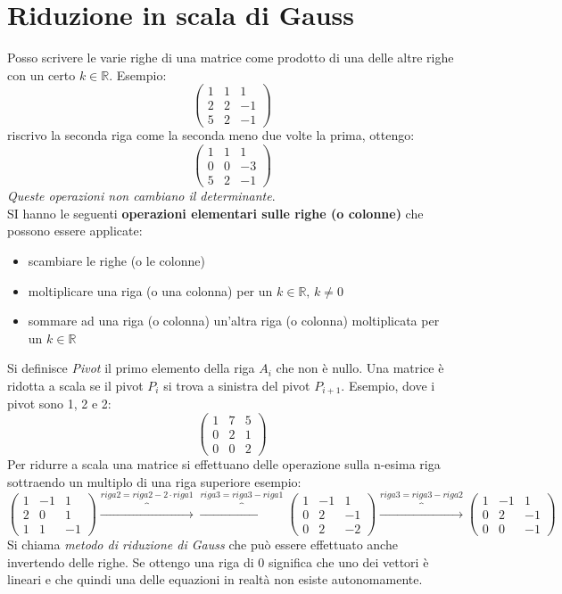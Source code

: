 \documentclass[a4paper,12pt, oneside]{book}
\begin{document}
\section{Riduzione in scala di Gauss}
Posso scrivere le varie righe di una matrice come prodotto di una delle altre righe con un certo $k\in\mathbb{R}$. Esempio:
$$
	\left(
	\begin{matrix}
			1 & 1 & 1  \\
			2 & 2 & -1 \\
			5 & 2 & -1
		\end{matrix}
	\right)
$$
riscrivo la seconda riga come la seconda meno due volte la prima, ottengo:
$$
	\left(
	\begin{matrix}
			1 & 1 & 1  \\
			0 & 0 & -3 \\
			5 & 2 & -1
		\end{matrix}
	\right)
$$
\textit{Queste operazioni non cambiano il determinante}.\\
SI hanno le seguenti \textbf{operazioni elementari sulle righe (o colonne)} che possono essere applicate:
\begin{itemize}
	\item scambiare le righe (o le colonne)
	\item moltiplicare una riga (o una colonna) per un $k\in \mathbb{R},\, k\neq 0$
	\item sommare ad una riga (o colonna) un'altra riga (o colonna) moltiplicata per un $k\in \mathbb{R}$
\end{itemize}
Si definisce \textit{Pivot} il primo elemento della riga $A_i$ che non è nullo. Una matrice è ridotta a scala se il pivot $P_i$ si trova a sinistra del pivot $P_{i+1}$. Esempio, dove i pivot sono 1, 2 e 2:
$$
	\left(\begin{matrix}
			1 & 7 & 5 \\
			0 & 2 & 1 \\
			0 & 0 & 2
		\end{matrix}\right)
$$
Per ridurre a scala una matrice si effettuano delle operazione sulla n-esima riga sottraendo un multiplo di una riga superiore
esempio:
$$
	\left(\begin{matrix}
			1 & -1 & 1  \\
			2 & 0  & 1  \\
			1 & 1  & -1
		\end{matrix}\right)\overbrace{\longrightarrow}^{riga2=riga2-2\cdot riga1}\overbrace{\longrightarrow}^{riga3=riga3- riga1}
	\left(\begin{matrix}
			1 & -1 & 1  \\
			0 & 2  & -1 \\
			0 & 2  & -2
		\end{matrix}\right)\overbrace{\longrightarrow}^{riga3=riga3- riga2}
	\left(\begin{matrix}
			1 & -1 & 1  \\
			0 & 2  & -1 \\
			0 & 0  & -1
		\end{matrix}\right)
$$
Si chiama \textit{metodo di riduzione di Gauss} che può essere effettuato anche invertendo delle righe.
Se ottengo una riga di 0 significa che uno dei vettori è lineari e che quindi una delle equazioni in realtà non esiste autonomamente.
\newpage
\end{document}
